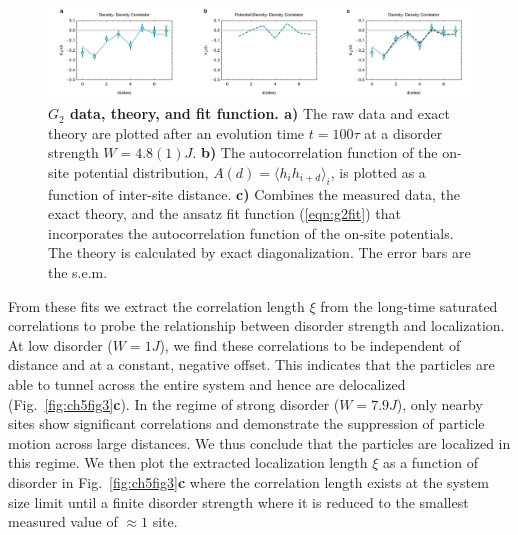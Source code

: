 \begin{figure}[t!]
		\includegraphics[width=\columnwidth]{figures/ch5/G2Combo_Row_2edit.pdf} 
		\caption{\textbf{$G_2$ data, theory, and fit function. a)} The raw data and exact theory are plotted after an evolution time $t=100\tau$ at a disorder strength $W=4.8(1)J$. \textbf{b)} The autocorrelation function of the on-site potential distribution, $A(d)=\langle h_i h_{i+d} \rangle_i $, is plotted as a function of inter-site distance. \textbf{c)} Combines the measured data, the exact theory, and the ansatz fit function (\ref{eqn:g2fit}) that incorporates the autocorrelation function of the on-site potentials. The theory is calculated by exact diagonalization. The error bars are the s.e.m.}
		\label{fig:g2Fit}	
\end{figure}

From these fits we extract the correlation length $\xi$ from the long-time saturated correlations to probe the relationship between disorder strength and localization. At low disorder ($W=1J$), we find these correlations to be independent of distance and at a constant, negative offset. This indicates that the particles are able to tunnel across the entire system and hence are delocalized (Fig.~\ref{fig:ch5fig3}\textbf{c}). In the regime of strong disorder ($W=7.9J$), only nearby sites show significant correlations and demonstrate the suppression of particle motion across large distances. We thus conclude that the particles are localized in this regime. We then plot the extracted localization length $\xi$ as a function of disorder in Fig.~\ref{fig:ch5fig3}\textbf{c} where the correlation length exists at the system size limit until a finite disorder strength where it is reduced to the smallest measured value of $\approx 1$ site.

